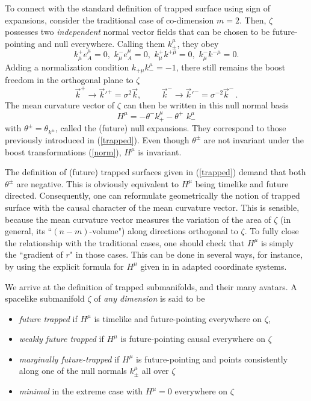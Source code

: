 \documentclass[12pt]{iopart}
\def\be{\begin{equation}}
\def\ee{\end{equation}}
\begin{document}
To connect with the standard definition of trapped surface using sign of expansions, consider the traditional case of co-dimension $m=2$. Then, $\zeta$ possesses two {\em independent} normal vector fields that can be chosen to be future-pointing and null everywhere. Calling them $k^\mu_\pm $, they obey
$$
k^+_{\mu}e^\mu_{A}=0, \, \, k^-_{\mu}e^\mu_{A}=0, \, \, k^+_{\mu}k^{+\mu}=0, \, \,
k^-_{\mu}k^{-\mu}=0. 
$$
Adding a normalization condition $k_{+\mu}k_{-}^{\mu}=-1$, there still remains the boost freedom in the orthogonal plane to $\zeta$
\be
\vec{k}^+ \longrightarrow \vec{k}'^+=\sigma^2 \vec{k}, \hspace{1cm}
\vec{k}^- \longrightarrow \vec{k}'^-=\sigma^{-2} \vec{k}^- \, .\label{norm}
\ee
The mean curvature vector of $\zeta$ can then be written in this null normal basis
$$H^\mu = -\theta^- k^\mu_+ -\theta^+\,\,  k^\mu_-$$
with $\theta^{\pm}=\theta_{ k^\pm}$, called the (future) null expansions. They correspond to those previously introduced in (\ref{trapped}). Even though $\theta^\pm$ are not invariant under the boost transformations (\ref{norm}), $H^\mu$ is invariant.

The definition of (future) trapped surfaces given in (\ref{trapped}) demand that both $\theta^\pm$ are negative. This is obviously equivalent to $H^\mu$ being timelike and future directed. Consequently, one can reformulate geometrically the notion of trapped surface with the causal character of the mean curvature vector. This is sensible, because the mean curvature vector measures the variation of the area of $\zeta$ (in general, its ``$(n-m)$-volume") along directions orthogonal to $\zeta$. To fully close the relationship with the traditional cases, one should check that $H^\mu$ is simply the ``gradient of $r$" in those cases. This can be done in several ways, for instance, by using the explicit formula for $H^\mu$ given in \cite{S2} in adapted coordinate systems. 

We arrive at the definition of trapped submanifolds, and their many avatars. A spacelike submanifold $\zeta$ of {\em any dimension} is said to be 
\begin{itemize}
\item {\em future trapped}  if $H^\mu$ is timelike and future-pointing everywhere on $\zeta$, 
\item {\em weakly future trapped} if $H^\mu$ is future-pointing causal everywhere on $\zeta$ 
\item {\em marginally future-trapped}  if $H^\mu$ is future-pointing and points consistently along one of the null normals $k^\mu_\pm$ all over $\zeta$
\item {\em minimal} in the extreme case with $H^\mu=0$ everywhere on $\zeta$
\end{itemize}
 
\end{document}
